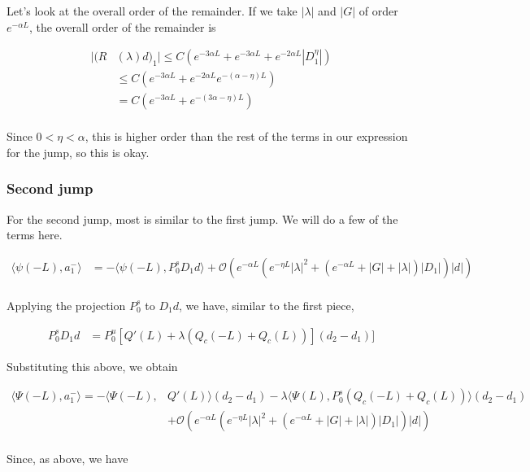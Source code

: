 \documentclass[12pt]{article}
\begin{document}
Let's look at the overall order of the remainder. If we take $|\lambda|$ and $|G|$ of order $e^{-\alpha L}$, the overall order of the remainder is

\begin{align*}
|(R&(\lambda)d)_1| \leq C ( e^{-3 \alpha L} + e^{-3 \alpha L} + e^{-2 \alpha L} |D_1^{\eta}| ) \\
&\leq C ( e^{-3 \alpha L} + e^{-2 \alpha L} e^{-(\alpha - \eta)L}) \\
&= C ( e^{-3 \alpha L} + e^{-(3 \alpha - \eta) L} )\\
\end{align*}

Since $0 < \eta < \alpha$, this is higher order than the rest of the terms in our expression for the jump, so this is okay.\\

\subsubsection*{Second jump}

For the second jump, most is similar to the first jump. We will do a few of the terms here.

\begin{align*}
\langle \psi(-L), a_1^- \rangle &= -\langle \psi(-L), P_0^s D_1 d \rangle + \mathcal{O} \left( e^{-\alpha L} (e^{-\eta L}|\lambda|^2 + (e^{-\alpha L} + |G| + |\lambda|)|D_1|)|d| \right)\\
\end{align*}

Applying the projection $P_0^s$ to $D_1 d$, we have, similar to the first piece,

\begin{align*}
P_0^s D_1 d &= P_0^u [Q'(L) + \lambda(Q_c(-L) + Q_c(L))](d_2 - d_1)]
\end{align*}

Substituting this above, we obtain

\begin{align*}
\langle \Psi(-L), a_1^- \rangle = -\langle \Psi(-L), &Q'(L) \rangle (d_2 - d_1) - \lambda \langle \Psi(L), P_0^s (Q_c(-L) + Q_c(L))\rangle(d_2 - d_1) \\
&+ \mathcal{O} \left( e^{-\alpha L} (e^{-\eta L}|\lambda|^2 + (e^{-\alpha L} + |G| + |\lambda|)|D_1|)|d| \right)\\
\end{align*}

Since, as above, we have
\end{document}
